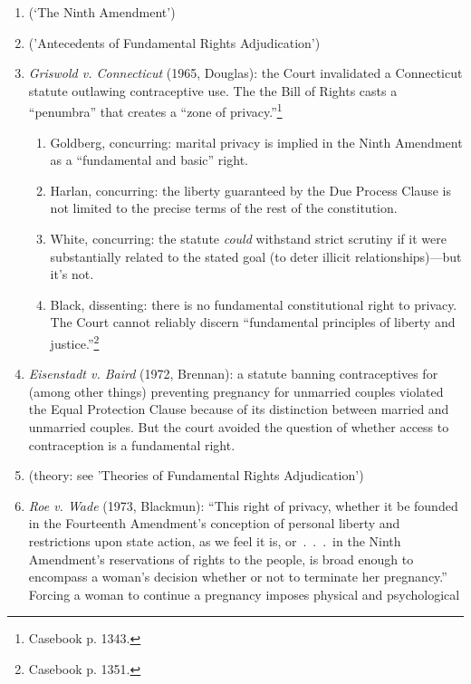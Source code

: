 \begin{enumerate}
    \item (`The Ninth Amendment') %
    \item ('Antecedents of Fundamental Rights Adjudication') %
    \item \emph{Griswold v. Connecticut} (1965, Douglas): the Court 
    invalidated a Connecticut statute outlawing contraceptive use. The 
    the Bill of Rights casts a ``penumbra'' that creates a ``zone of 
    privacy.''\footnote{Casebook p. 1343.}
    \begin{enumerate}
        \item Goldberg, concurring: marital privacy is implied in the Ninth 
        Amendment as a ``fundamental and basic'' right.
        \item Harlan, concurring: the liberty guaranteed by the Due Process 
        Clause is not limited to the precise terms of the rest of the 
        constitution.
        \item White, concurring: the statute \emph{could} withstand strict 
        scrutiny if it were substantially related to the stated goal (to deter 
        illicit relationships)---but it's not.
        \item Black, dissenting: there is no fundamental constitutional right 
        to privacy. The Court cannot reliably discern ``fundamental principles 
        of liberty and justice.''\footnote{Casebook p. 1351.}
    \end{enumerate}
    \item \emph{Eisenstadt v. Baird} (1972, Brennan): a statute banning 
    contraceptives for (among other things) preventing pregnancy for unmarried 
    couples violated the Equal Protection Clause because of its distinction 
    between married and unmarried couples. But the court avoided the question 
    of whether access to contraception is a fundamental right.
    \item (theory: see 'Theories of Fundamental Rights Adjudication') %
    \item \emph{Roe v. Wade} (1973, Blackmun): ``This right of privacy, 
    whether it be founded in the Fourteenth Amendment's conception of personal 
    liberty and restrictions upon state action, as we feel it is, or~.~.~.~in 
    the Ninth Amendment's reservations of rights to the people, is broad 
    enough to encompass a woman's decision whether or not to terminate her 
    pregnancy.'' %
    Forcing a woman to continue a pregnancy imposes physical and psychological 

\end{enumerate}
